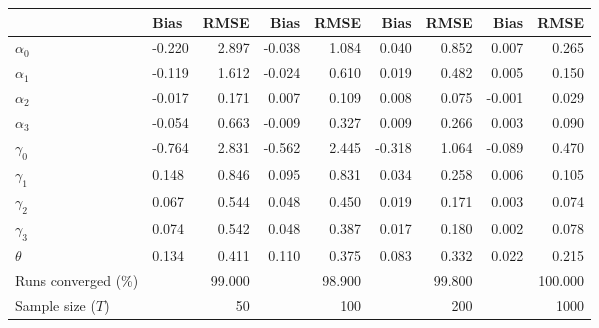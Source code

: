
\begin{tabular}[t]{llrrrrrrr}
\toprule
  & Bias & RMSE & Bias & RMSE & Bias & RMSE & Bias & RMSE\\
\midrule
$\alpha_{0}$ & -0.220 & 2.897 & -0.038 & 1.084 & 0.040 & 0.852 & 0.007 & 0.265\\
$\alpha_{1}$ & -0.119 & 1.612 & -0.024 & 0.610 & 0.019 & 0.482 & 0.005 & 0.150\\
$\alpha_{2}$ & -0.017 & 0.171 & 0.007 & 0.109 & 0.008 & 0.075 & -0.001 & 0.029\\
$\alpha_{3}$ & -0.054 & 0.663 & -0.009 & 0.327 & 0.009 & 0.266 & 0.003 & 0.090\\
$\gamma_{0}$ & -0.764 & 2.831 & -0.562 & 2.445 & -0.318 & 1.064 & -0.089 & 0.470\\
$\gamma_{1}$ & 0.148 & 0.846 & 0.095 & 0.831 & 0.034 & 0.258 & 0.006 & 0.105\\
$\gamma_{2}$ & 0.067 & 0.544 & 0.048 & 0.450 & 0.019 & 0.171 & 0.003 & 0.074\\
$\gamma_{3}$ & 0.074 & 0.542 & 0.048 & 0.387 & 0.017 & 0.180 & 0.002 & 0.078\\
$\theta$ & 0.134 & 0.411 & 0.110 & 0.375 & 0.083 & 0.332 & 0.022 & 0.215\\
Runs converged (\%) &  & 99.000 &  & 98.900 &  & 99.800 &  & 100.000\\
Sample size ($T$) &  & 50 &  & 100 &  & 200 &  & 1000\\
\bottomrule
\end{tabular}
